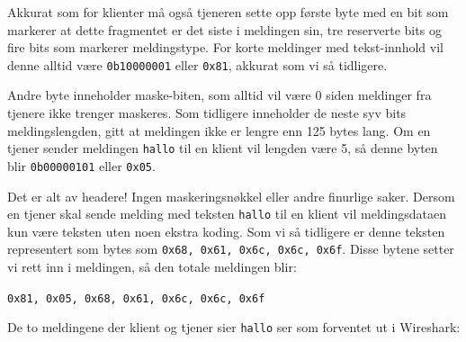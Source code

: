 \documentclass{article}
\newcommand{\code}[1]{\colorbox{light-gray}{\texttt{#1}}}
\begin{document}
Akkurat som for klienter må også tjeneren sette opp første byte med en bit som markerer at dette fragmentet er det siste i meldingen sin, tre reserverte bits og fire bits som markerer meldingstype. For korte meldinger med tekst-innhold vil denne alltid være \code{0b10000001} eller \code{0x81}, akkurat som vi så tidligere.

Andre byte inneholder maske-biten, som alltid vil være 0 siden meldinger fra tjenere ikke trenger maskeres. Som tidligere inneholder de neste syv bits meldingslengden, gitt at meldingen ikke er lengre enn 125 bytes lang. Om en tjener sender meldingen \code{hallo} til en klient vil lengden være 5, så denne byten blir \code{0b00000101} eller \code{0x05}.

Det er alt av headere! Ingen maskeringsnøkkel eller andre finurlige saker. Dersom en tjener skal sende melding med teksten \code{hallo} til en klient vil meldingsdataen kun være teksten uten noen ekstra koding. Som vi så tidligere er denne teksten representert som bytes som \code{0x68, 0x61, 0x6c, 0x6c, 0x6f}. Disse bytene setter vi rett inn i meldingen, så den totale meldingen blir:

\begin{center}
    \code{0x81, 0x05, 0x68, 0x61, 0x6c, 0x6c, 0x6f}
\end{center}

De to meldingene der klient og tjener sier \code{hallo} ser som forventet ut i Wireshark:
\end{document}
